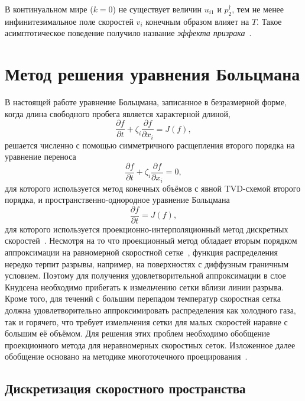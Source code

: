 \documentclass[
aps,%
12pt,%
final,%
notitlepage,%
oneside,%
onecolumn,%
nobibnotes,%
nofootinbib,%
superscriptaddress,%
noshowpacs,%
showkeys,%
centertags]%
{revtex4}
\newcommand{\pder}[2][]{\frac{\partial#1}{\partial#2}}
\begin{document}
В континуальном мире (\(k=0\)) не существует величин \(u_{i1}\) и \(p^\dag_2\),
тем не менее инфинитезимальное поле скоростей \(v_i\) конечным образом влияет на \(T\).
Такое асимптотическое поведение получило название \emph{эффекта призрака}~\cite{Sone2002, Sone2007}.

\section{Метод решения уравнения Больцмана}

В настоящей работе уравнение Больцмана, записанное в безразмерной форме,
когда длина свободного пробега является характерной длиной,
\begin{equation}\label{eq:split_transport}
    \pder[f]{t} + \zeta_i\pder[f]{x_i} = J(f),
\end{equation}
решается численно с помощью симметричного расщепления второго порядка на уравнение переноса
\begin{equation}\label{eq:split_transport}
    \pder[f]{t} + \zeta_i\pder[f]{x_i} = 0,
\end{equation}
для которого используется метод конечных объёмов с явной TVD-схемой второго порядка,
и пространственно-однородное уравнение Больцмана
\begin{equation}\label{eq:split_collisions}
    \pder[f]{t} = J(f),
\end{equation}
для которого используется проекционно-интерполяционный
метод дискретных скоростей~\cite{Tcheremissine1997, Tcheremissine2006, Dodulad2015}.
Несмотря на то что проекционный метод обладает вторым порядком аппроксимации
на равномерной скоростной сетке~\cite{Anikin2012},
функция распределения нередко терпит разрывы, например, на поверхностях с диффузным граничным условием.
Поэтому для получения удовлетворительной аппроксимации в слое Кнудсена необходимо прибегать
к измельчению сетки вблизи линии разрыва.
Кроме того, для течений с большим перепадом температур скоростная сетка должна удовлетворительно аппроксимировать
распределения как холодного газа, так и горячего, что требует измельчения сетки для малых скоростей
наравне с большим её объёмом.
Для решения этих проблем необходимо обобщение проекционного метода для неравномерных скоростных сеток.
Изложенное далее обобщение основано на методике многоточечного проецирования~\citep{Dodulad2012}.

\subsection{Дискретизация скоростного пространства}
\end{document}
